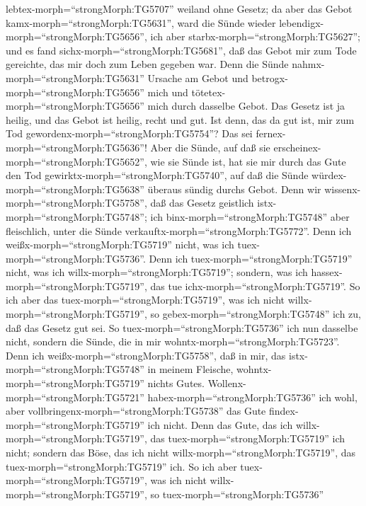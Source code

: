 lebtex-morph=``strongMorph:TG5707'' weiland ohne Gesetz; da aber das
Gebot kamx-morph=``strongMorph:TG5631'', ward die Sünde wieder
lebendigx-morph=``strongMorph:TG5656'',  ich aber
starbx-morph=``strongMorph:TG5627''; und es fand
sichx-morph=``strongMorph:TG5681'', daß das Gebot mir zum Tode
gereichte, das mir doch zum Leben gegeben war.  Denn die
Sünde nahmx-morph=``strongMorph:TG5631'' Ursache am Gebot und
betrogx-morph=``strongMorph:TG5656'' mich und
tötetex-morph=``strongMorph:TG5656'' mich durch dasselbe Gebot.
 Das Gesetz ist ja heilig, und das Gebot ist heilig, recht
und gut.  Ist denn, das da gut ist, mir zum Tod
gewordenx-morph=``strongMorph:TG5754''? Das sei
fernex-morph=``strongMorph:TG5636''! Aber die Sünde, auf daß sie
erscheinex-morph=``strongMorph:TG5652'', wie sie Sünde ist, hat sie mir
durch das Gute den Tod gewirktx-morph=``strongMorph:TG5740'', auf daß
die Sünde würdex-morph=``strongMorph:TG5638'' überaus sündig durchs
Gebot.  Denn wir wissenx-morph=``strongMorph:TG5758'', daß
das Gesetz geistlich istx-morph=``strongMorph:TG5748''; ich
binx-morph=``strongMorph:TG5748'' aber fleischlich, unter die Sünde
verkauftx-morph=``strongMorph:TG5772''.  Denn ich
weißx-morph=``strongMorph:TG5719'' nicht, was ich
tuex-morph=``strongMorph:TG5736''. Denn ich
tuex-morph=``strongMorph:TG5719'' nicht, was ich
willx-morph=``strongMorph:TG5719''; sondern, was ich
hassex-morph=``strongMorph:TG5719'', das tue
ichx-morph=``strongMorph:TG5719''.  So ich aber das
tuex-morph=``strongMorph:TG5719'', was ich nicht
willx-morph=``strongMorph:TG5719'', so
gebex-morph=``strongMorph:TG5748'' ich zu, daß das Gesetz gut sei.
 So tuex-morph=``strongMorph:TG5736'' ich nun dasselbe
nicht, sondern die Sünde, die in mir
wohntx-morph=``strongMorph:TG5723''.  Denn ich
weißx-morph=``strongMorph:TG5758'', daß in mir, das
istx-morph=``strongMorph:TG5748'' in meinem Fleische,
wohntx-morph=``strongMorph:TG5719'' nichts Gutes.
Wollenx-morph=``strongMorph:TG5721'' habex-morph=``strongMorph:TG5736''
ich wohl, aber vollbringenx-morph=``strongMorph:TG5738'' das Gute
findex-morph=``strongMorph:TG5719'' ich nicht.  Denn das
Gute, das ich willx-morph=``strongMorph:TG5719'', das
tuex-morph=``strongMorph:TG5719'' ich nicht; sondern das Böse, das ich
nicht willx-morph=``strongMorph:TG5719'', das
tuex-morph=``strongMorph:TG5719'' ich.  So ich aber
tuex-morph=``strongMorph:TG5719'', was ich nicht
willx-morph=``strongMorph:TG5719'', so tuex-morph=``strongMorph:TG5736''
